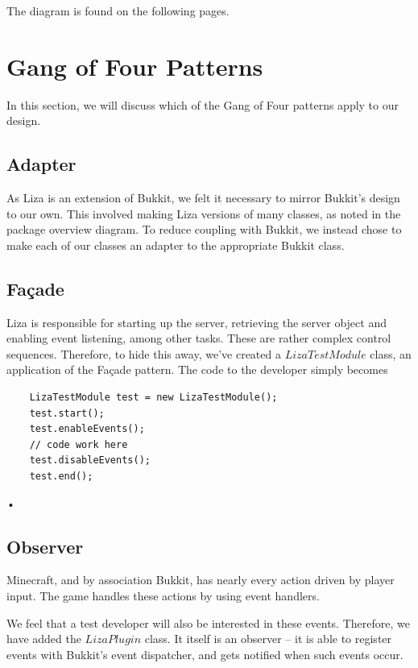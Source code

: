 \documentclass{article}
\begin{document}
The diagram is found on the following pages.
\newline

\newpage


\newpage

\section{Gang of Four Patterns}

In this section, we will discuss which of the Gang of Four patterns
apply to our design.

	\subsection{Adapter}

	As Liza is an extension of Bukkit, we felt it necessary to mirror 
	Bukkit's design to our own. This involved making Liza versions of many
	classes, as noted in the package overview diagram. To reduce coupling
	with Bukkit, we instead chose to make each of our classes an adapter
	to the appropriate Bukkit class. 

	\subsection{Fa\c{c}ade}

	Liza is responsible for starting up the server, retrieving the server object and
	enabling event listening, among other tasks. These are rather complex
	control sequences. Therefore, to hide this away, we've created a $LizaTestModule$
	class, an application of the Fa\c{c}ade pattern. The code to the developer simply
	becomes

	\begin{verbatim}
	LizaTestModule test = new LizaTestModule();
	test.start();
	test.enableEvents();
	// code work here
	test.disableEvents();
	test.end();
	\end{verbatim}•

	\subsection{Observer}

	Minecraft, and by association Bukkit, has nearly every action driven
	by player input. The game handles these actions by using event handlers.
	
	We feel that a test developer will also be interested in these events.
	Therefore, we have added the $LizaPlugin$ class. It itself is an observer --
	it is able to register events with Bukkit's event dispatcher, and gets notified 
	when such events occur. 
\end{document}

